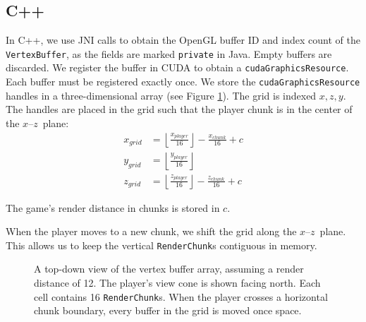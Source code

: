 \documentclass[]{article}
\begin{document}
\subsection{C++}
In C++, we use JNI calls to obtain the OpenGL buffer ID and index count of the \texttt{VertexBuffer}, as the fields are marked \texttt{private} in Java.
Empty buffers are discarded.
We register the buffer in CUDA to obtain a \texttt{cudaGraphicsResource}.
Each buffer must be registered exactly once.
We store the \texttt{cudaGraphicsResource} handles in a three-dimensional array (see Figure \ref{fig:grid}).
The grid is indexed $x,z,y$.
The handles are placed in the grid such that the player chunk is in the center of the $x$\nobreakdash--$z$~plane:
\begin{align}
  x_{grid} &= \left\lfloor\frac{x_{player}}{16}\right\rfloor - \frac{x_{chunk}}{16} + c \nonumber \\
  y_{grid} &= \left\lfloor\frac{y_{player}}{16}\right\rfloor \nonumber \\
  z_{grid} &= \left\lfloor\frac{z_{player}}{16}\right\rfloor - \frac{z_{chunk}}{16} + c \nonumber
\end{align}
\begin{center}
  The game's render distance in chunks is stored in $c$.
\end{center}

When the player moves to a new chunk, we shift the grid along the $x$\nobreakdash--$z$~plane.
This allows us to keep the vertical \texttt{RenderChunk}s contiguous in memory.

\begin{figure}
  \centering
  \caption[Top-down view of vertex buffer array]{
    A top-down view of the vertex buffer array, assuming a render distance of 12.
    The player's view cone is shown facing north.
    Each cell contains 16 \texttt{RenderChunk}s.
    When the player crosses a horizontal chunk boundary, every buffer in the grid is moved once space.
  }
  \label{fig:grid}
\end{figure}
\end{document}
